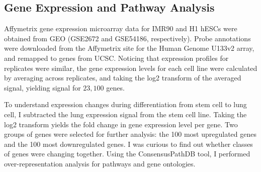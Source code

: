 \subsection*{Gene Expression and Pathway Analysis}

Affymetrix gene expression microarray data for IMR90 and H1 hESCs were obtained from GEO (GSE2672\cite{kim2005}
and GSE54186\cite{kim2014}, respectively).  Probe annotations were downloaded from the Affymetrix site for
the Human Genome U133v2 array, and remapped to genes from UCSC\@.  Noticing that expression profiles for replicates
were similar, the gene expression levels for each cell line were calculated by averaging across replicates, and
taking the log2 transform of the averaged signal, yielding signal for $23,100$ genes.


To understand expression changes during differentiation from stem cell to lung cell, I subtracted the lung expression
signal from the stem cell line.  Taking the log2 transform yields the fold change in gene expression level per gene.
Two groups of genes were selected for further analysis: the 100 most upregulated genes and the 100 most downregulated
genes.  I was curious to find out whether classes of genes were changing together.  Using the ConsensusPathDB
tool\cite{kamburov2012}, I performed over-representation analysis for pathways and gene ontologies.

